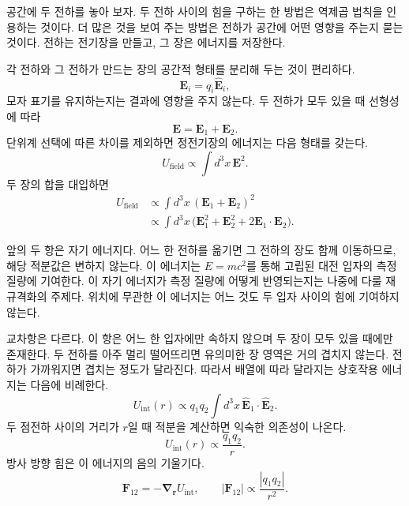 공간에 두 전하를 놓아 보자. 두 전하 사이의 힘을 구하는 한 방법은 역제곱 법칙을 인용하는 것이다. 더 많은 것을 보여 주는 방법은 전하가 공간에 어떤 영향을 주는지 묻는 것이다. 전하는 전기장을 만들고, 그 장은 에너지를 저장한다.

각 전하와 그 전하가 만드는 장의 공간적 형태를 분리해 두는 것이 편리하다.
\begin{equation}
\mathbf E_i=q_i\widehat{\mathbf E}_i,
\end{equation}
모자 표기를 유지하는지는 결과에 영향을 주지 않는다. 두 전하가 모두 있을 때 선형성에 따라
\begin{equation}
\mathbf{E}=\mathbf{E}_1+\mathbf{E}_2.
\end{equation}
단위계 선택에 따른 차이를 제외하면 정전기장의 에너지는 다음 형태를 갖는다.
\begin{equation}
U_{\text{field}}\propto\int d^3x\,\mathbf{E}^2.
\end{equation}
두 장의 합을 대입하면
\begin{align}
U_{\text{field}}
&\propto\int d^3x\,(\mathbf{E}_1+\mathbf{E}_2)^2 \\
&\propto\int d^3x\,\bigl(\mathbf{E}_1^2+\mathbf{E}_2^2
  +2\mathbf{E}_1\!\cdot\!\mathbf{E}_2\bigr).
\end{align}

앞의 두 항은 자기 에너지다. 어느 한 전하를 옮기면 그 전하의 장도 함께 이동하므로, 해당 적분값은 변하지 않는다. 이 에너지는 \(E=mc^2\)를 통해 고립된 대전 입자의 측정 질량에 기여한다. 이 자기 에너지가 측정 질량에 어떻게 반영되는지는 나중에 다룰 재규격화의 주제다. 위치에 무관한 이 에너지는 어느 것도 두 입자 사이의 힘에 기여하지 않는다.

교차항은 다르다. 이 항은 어느 한 입자에만 속하지 않으며 두 장이 모두 있을 때에만 존재한다. 두 전하를 아주 멀리 떨어뜨리면 유의미한 장 영역은 거의 겹치지 않는다. 전하가 가까워지면 겹치는 정도가 달라진다. 따라서 배열에 따라 달라지는 상호작용 에너지는 다음에 비례한다.
\begin{equation}
U_{\text{int}}(r)\propto q_1q_2\int d^3x\,
\widehat{\mathbf E}_1\!\cdot\!\widehat{\mathbf E}_2.
\end{equation}
두 점전하 사이의 거리가 \(r\)일 때 적분을 계산하면 익숙한 의존성이 나온다.
\begin{equation}
U_{\text{int}}(r)\propto\frac{q_1q_2}{r}.
\end{equation}
방사 방향 힘은 이 에너지의 음의 기울기다.
\begin{equation}
\mathbf F_{12}=-\boldsymbol\nabla_{\mathbf r}U_{\text{int}},
\qquad
|\mathbf F_{12}|\propto\frac{|q_1q_2|}{r^2}.
\end{equation}

